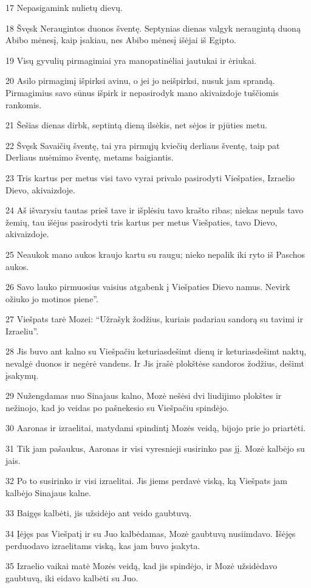 \par 17 Nepasigamink nulietų dievų. 
\par 18 Švęsk Neraugintos duonos šventę. Septynias dienas valgyk neraugintą duoną Abibo mėnesį, kaip įsakiau, nes Abibo mėnesį išėjai iš Egipto. 
\par 19 Visų gyvulių pirmagimiai yra mano­patinėliai jautukai ir ėriukai. 
\par 20 Asilo pirmagimį išpirksi avinu, o jei jo neišpirksi, nusuk jam sprandą. Pirmagimius savo sūnus išpirk ir nepasirodyk mano akivaizdoje tuščiomis rankomis. 
\par 21 Šešias dienas dirbk, septintą dieną ilsėkis, net sėjos ir pjūties metu. 
\par 22 Švęsk Savaičių šventę, tai yra pirmųjų kviečių derliaus šventę, taip pat Derliaus nuėmimo šventę, metams baigiantis. 
\par 23 Tris kartus per metus visi tavo vyrai privalo pasirodyti Viešpaties, Izraelio Dievo, akivaizdoje. 
\par 24 Aš išvarysiu tautas prieš tave ir išplėsiu tavo krašto ribas; niekas nepuls tavo žemių, tau išėjus pasirodyti tris kartus per metus Viešpaties, tavo Dievo, akivaizdoje. 
\par 25 Neaukok mano aukos kraujo kartu su raugu; nieko nepalik iki ryto iš Paschos aukos. 
\par 26 Savo lauko pirmuosius vaisius atgabenk į Viešpaties Dievo namus. Nevirk ožiuko jo motinos piene”. 
\par 27 Viešpats tarė Mozei: “Užrašyk žodžius, kuriais padariau sandorą su tavimi ir Izraeliu”. 
\par 28 Jis buvo ant kalno su Viešpačiu keturiasdešimt dienų ir keturiasdešimt naktų, nevalgė duonos ir negėrė vandens. Ir Jis įrašė plokštėse sandoros žodžius, dešimt įsakymų. 
\par 29 Nužengdamas nuo Sinajaus kalno, Mozė nešėsi dvi liudijimo plokštes ir nežinojo, kad jo veidas po pašnekesio su Viešpačiu spindėjo. 
\par 30 Aaronas ir izraelitai, matydami spindintį Mozės veidą, bijojo prie jo priartėti. 
\par 31 Tik jam pašaukus, Aaronas ir visi vyresnieji susirinko pas jį. Mozė kalbėjo su jais. 
\par 32 Po to susirinko ir visi izraelitai. Jis jiems perdavė viską, ką Viešpats jam kalbėjo Sinajaus kalne. 
\par 33 Baigęs kalbėti, jis užsidėjo ant veido gaubtuvą. 
\par 34 Įėjęs pas Viešpatį ir su Juo kalbėdamas, Mozė gaubtuvą nusiimdavo. Išėjęs perduodavo izraelitams viską, kas jam buvo įsakyta. 
\par 35 Izraelio vaikai matė Mozės veidą, kad jis spindėjo, ir Mozė užsidėdavo gaubtuvą, iki eidavo kalbėti su Juo.



